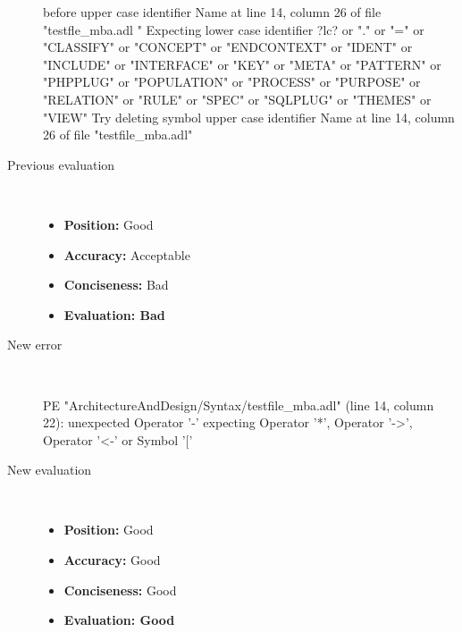 \begin{description}
\begin{haskell}
before upper case identifier Name at line 14, column 26 of file "testfle_mba.adl
" Expecting lower case identifier ?lc? or "." or "=" or "CLASSIFY" or "CONCEPT" or  "ENDCONTEXT" or "IDENT" or "INCLUDE" or "INTERFACE" or "KEY" or "META" or "PATTERN" or "PHPPLUG" or "POPULATION" or "PROCESS" or "PURPOSE" or "RELATION" or "RULE" or "SPEC" or "SQLPLUG" or "THEMES" or "VIEW"
Try deleting symbol upper case identifier Name at line 14, column 26 of file "testfile_mba.adl"\end{haskell}
  \item[Previous evaluation]~\\
    \begin{itemize}
    \item \textbf{Position:} Good
    \item \textbf{Accuracy:} Acceptable
    \item \textbf{Conciseness:} Bad
    \item \textbf{Evaluation: Bad}
    \end{itemize}
  \item[New error]~\\
\begin{haskell}
PE "ArchitectureAndDesign/Syntax/testfile_mba.adl" (line 14, column 22):
unexpected Operator '-'
expecting Operator '*', Operator '->', Operator '<-' or Symbol '['\end{haskell}
  \item[New evaluation]~\\
    \begin{itemize}
    \item \textbf{Position:} Good
    \item \textbf{Accuracy:} Good
    \item \textbf{Conciseness:} Good
    \item \textbf{Evaluation: Good}
    \end{itemize}
  \end{description}

\hrulefill

